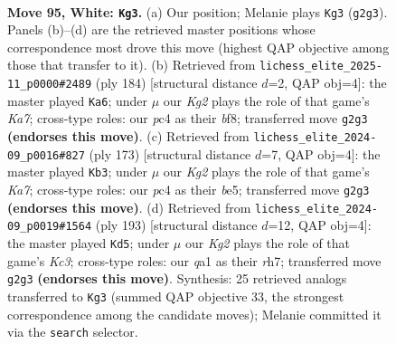 \documentclass[11pt]{article}
\begin{document}
\clearpage

\begin{figure}[p]\centering
\begin{subfigure}{0.46\textwidth}\centering
\resizebox{\linewidth}{!}{%
\newchessgame
\chessboard[
  setfen={8/8/8/8/2p1k3/8/6K1/q2q4 w - - 0 95},
  showmover=false,
  pgfstyle=straightmove, color=movearrow, markmove={g2-g3}
]}
\caption{}
\end{subfigure}\hfill
\begin{subfigure}{0.46\textwidth}\centering
\resizebox{\linewidth}{!}{%
\newchessgame
\chessboard[
  setfen={5b2/K7/8/8/5k2/8/8/1q2q3 w - - 2 93},
  showmover=false,
  pgfstyle=straightmove, color=movearrow, markmove={a7-a6}
]}
\caption{}
\end{subfigure}
\\[4pt]
\begin{subfigure}{0.46\textwidth}\centering
\resizebox{\linewidth}{!}{%
\newchessgame
\chessboard[
  setfen={2Q2Q2/8/8/4B3/4K3/8/k7/8 b - - 0 87},
  showmover=false,
  pgfstyle=straightmove, color=movearrow, markmove={a2-b3}
]}
\caption{}
\end{subfigure}\hfill
\begin{subfigure}{0.46\textwidth}\centering
\resizebox{\linewidth}{!}{%
\newchessgame
\chessboard[
  setfen={8/4Q2R/2k5/5K2/8/8/8/8 b - - 2 97},
  showmover=false,
  pgfstyle=straightmove, color=movearrow, markmove={c6-d5}
]}
\caption{}
\end{subfigure}
\caption{\textbf{Move 95, White: \texttt{Kg3}.} (a) Our position; Melanie plays \texttt{Kg3} (\texttt{g2g3}). Panels (b)--(d) are the retrieved master positions whose correspondence most drove this move (highest QAP objective among those that transfer to it). (b) Retrieved from \texttt{lichess\_elite\_2025-11\_p0000\#2489} (ply 184) [structural distance $d$=2, QAP obj=4]: the master played \texttt{Ka6}; under $\mu$ our \emph{Kg2} plays the role of that game's \emph{Ka7}; cross-type roles: our \emph{p}c4 as their \emph{b}f8; transferred move \texttt{g2g3} \textbf{(endorses this move)}. (c) Retrieved from \texttt{lichess\_elite\_2024-09\_p0016\#827} (ply 173) [structural distance $d$=7, QAP obj=4]: the master played \texttt{Kb3}; under $\mu$ our \emph{Kg2} plays the role of that game's \emph{Ka7}; cross-type roles: our \emph{p}c4 as their \emph{b}e5; transferred move \texttt{g2g3} \textbf{(endorses this move)}. (d) Retrieved from \texttt{lichess\_elite\_2024-09\_p0019\#1564} (ply 193) [structural distance $d$=12, QAP obj=4]: the master played \texttt{Kd5}; under $\mu$ our \emph{Kg2} plays the role of that game's \emph{Kc3}; cross-type roles: our \emph{q}a1 as their \emph{r}h7; transferred move \texttt{g2g3} \textbf{(endorses this move)}. Synthesis: 25 retrieved analogs transferred to \texttt{Kg3} (summed QAP objective 33, the strongest correspondence among the candidate moves); Melanie committed it via the \texttt{search} selector.}
\label{fig:thought-m188}
\end{figure}
\end{document}
